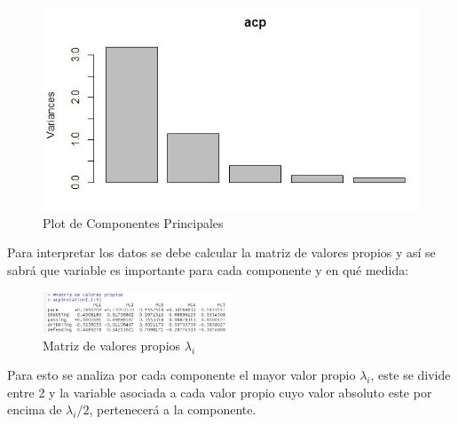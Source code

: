\documentclass[a4paper,10pt,twocolumn]{article}
\begin{document}
\begin{figure}[h]
	\includegraphics[scale=0.55]{./imgs/acp_plot.jpg}
	\caption{Plot de Componentes Principales}
\end{figure}


Para interpretar los datos se debe calcular la matriz de valores propios y así se sabrá que variable es importante para cada componente y en qué medida:

\begin{figure}[h]
	\includegraphics[width=0.5\textwidth]{./imgs/acp_vp.jpg}
	\caption{Matriz de valores propios $\lambda_{i}$}
\end{figure}


Para esto se analiza por cada componente el mayor valor propio $\lambda_i$, este se divide entre 2 y la variable asociada a cada valor propio cuyo valor absoluto este por encima de $\lambda_i / 2$, pertenecerá a la componente.
\end{document}
